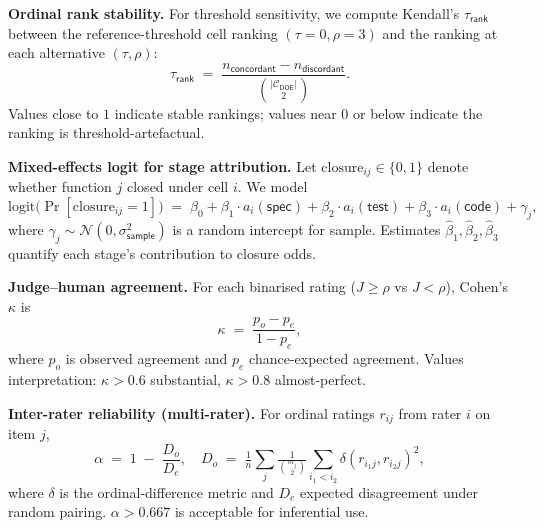 \textbf{Ordinal rank stability.} For threshold sensitivity, we compute
Kendall's $\tau_{\textsf{rank}}$ between the reference-threshold cell
ranking $(\tau = 0, \rho = 3)$ and the ranking at each alternative
$(\tau, \rho)$:
\begin{equation}
  \tau_{\textsf{rank}}
  \;=\;
  \frac{n_{\textsf{concordant}} - n_{\textsf{discordant}}}{\binom{|\mathcal{C}_{\textsf{DOE}}|}{2}}.
  \label{eq:kendall}
\end{equation}
Values close to $1$ indicate stable rankings; values near $0$ or below
indicate the ranking is threshold-artefactual.


\textbf{Mixed-effects logit for stage attribution.} Let
$\text{closure}_{ij} \in \{0, 1\}$ denote whether function $j$ closed
under cell $i$. We model
\begin{equation}
  \text{logit}\bigl(\Pr[\text{closure}_{ij} = 1]\bigr)
  \;=\;
  \beta_0
  + \beta_1 \cdot a_i(\textsf{spec})
  + \beta_2 \cdot a_i(\textsf{test})
  + \beta_3 \cdot a_i(\textsf{code})
  + \gamma_j,
  \label{eq:mixedlogit}
\end{equation}
where $\gamma_j \sim \mathcal{N}(0, \sigma_{\textsf{sample}}^2)$ is a random
intercept for sample. Estimates $\hat\beta_1, \hat\beta_2, \hat\beta_3$
quantify each stage's contribution to closure odds.


\textbf{Judge--human agreement.} For each binarised rating
($J \geq \rho$ vs $J < \rho$), Cohen's $\kappa$ is
\begin{equation}
  \kappa
  \;=\;
  \frac{p_o - p_e}{1 - p_e},
  \label{eq:kappa}
\end{equation}
where $p_o$ is observed agreement and $p_e$ chance-expected agreement.
Values interpretation: $\kappa > 0.6$ substantial, $\kappa > 0.8$
almost-perfect.

\textbf{Inter-rater reliability (multi-rater).} For ordinal ratings
$r_{ij}$ from rater $i$ on item $j$,
\begin{equation}
  \alpha
  \;=\;
  1 \;-\; \frac{D_o}{D_e},
  \quad
  D_o \;=\; \tfrac{1}{n}\sum_{j} \tfrac{1}{\binom{m_j}{2}}
            \sum_{i_1 < i_2} \delta(r_{i_1 j}, r_{i_2 j})^2,
  \label{eq:alpha}
\end{equation}
where $\delta$ is the ordinal-difference metric and $D_e$ expected
disagreement under random pairing. $\alpha > 0.667$ is acceptable for
inferential use.

